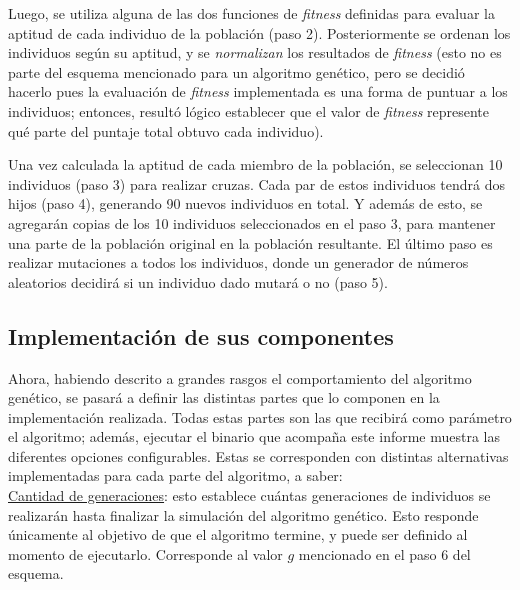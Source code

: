 \documentclass[12pt,a4paper]{article}
\begin{document}
    Luego, se utiliza alguna de las dos funciones de \textit{fitness} definidas para evaluar la aptitud de cada individuo de la población (paso 2). Posteriormente se ordenan los individuos según su aptitud, y se \textit{normalizan} los resultados de \textit{fitness} (esto no es parte del esquema mencionado para un algoritmo genético, pero se decidió hacerlo pues la evaluación de \textit{fitness} implementada es una forma de puntuar a los individuos; entonces, resultó lógico establecer que el valor de \textit{fitness} represente qué parte del puntaje total obtuvo cada individuo).
    
    Una vez calculada la aptitud de cada miembro de la población, se seleccionan 10 individuos (paso 3) para realizar cruzas. Cada par de estos individuos tendrá dos hijos (paso 4), generando 90 nuevos individuos en total. Y además de esto, se agregarán copias de los 10 individuos seleccionados en el paso 3, para mantener una parte de la población original en la población resultante. El último paso es realizar mutaciones a todos los individuos, donde un generador de números aleatorios decidirá si un individuo dado mutará o no (paso 5).
    
    
    \subsection{Implementación de sus componentes}

    Ahora, habiendo descrito a grandes rasgos el comportamiento del algoritmo genético, se pasará a definir las distintas partes que lo componen en la implementación realizada. Todas estas partes son las que recibirá como parámetro el algoritmo; además, ejecutar el binario que acompaña este informe muestra las diferentes opciones configurables. Estas se corresponden con distintas alternativas implementadas para cada parte del algoritmo, a saber: \\[4pt]
    
    \underline{Cantidad de generaciones}: esto establece cuántas generaciones de individuos se realizarán hasta finalizar la simulación del algoritmo genético. Esto responde únicamente al objetivo de que el algoritmo termine, y puede ser definido al momento de ejecutarlo. Corresponde al valor $g$ mencionado en el paso 6 del esquema.
    
\end{document}
